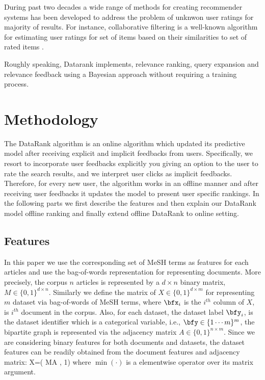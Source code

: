 \documentclass[twoside,11pt]{article}
\begin{document}
During past two decades a wide range of methods for creating recommender systems has been developed \cite{recommender-survey} to address the problem of unknwon user ratings for majority of results. For instance, collaborative filtering is a well-known algorithm for estimating user ratings for set of items based on their similarities to set of rated items \cite{cff-survey}.

Roughly speaking, Datarank implements, relevance ranking, query expansion and  relevance feedback using a Bayesian approach without requiring a training process.

\section{Methodology} \label{sec:methodology}
The DataRank algorithm is an online algorithm which updated its predictive model after receiving explicit and implicit feedbacks from users. Specifically, we resort to incorporate user feedbacks explicitly you giving an option to the user to rate the search results, and we interpret user clicks as implicit feedbacks. Therefore, for every new user, the algorithm works in an offline manner and after receiving user feedbacks it updates the model to present user specific rankings. In the following parts we first describe the features and then explain our DataRank model offline ranking and finally extend offline DataRank to online setting.

\subsection{Features}
In this paper we use the corresponding set of MeSH terms as features for each articles and use the bag-of-words representation for representing documents. More precisely, the corpus $n$ articles is represented by a $d \times n$ binary matrix, $M\in \{0,1\}^{d\times n}$. Similarly we define the matrix of $X\in \{0,1\}^{d\times m}$ for representing $m$ dataset via bag-of-words of MeSH terms, where $\bfx_i$ is the $i^{th}$ column of $X$, is $i^{th}$ document in the corpus. Also, for each dataset, the dataset  label $\bfy_i$, is the dataset identifier which is a categorical variable, i.e., $\bfy \in \{{1\cdots m}\}^m$, the bipartite graph is represented via the adjacency matrix $A\in \{0,1\}^{n\times m}$. Since we are considering binary features for both documents and datasets, the dataset features can be readily obtained from the document features and adjacency matrix:
\beq
X=\min( MA , 1)
\eeq
where $\min(\cdot)$ is a elementwise operator over its matrix argument.
\end{document}
